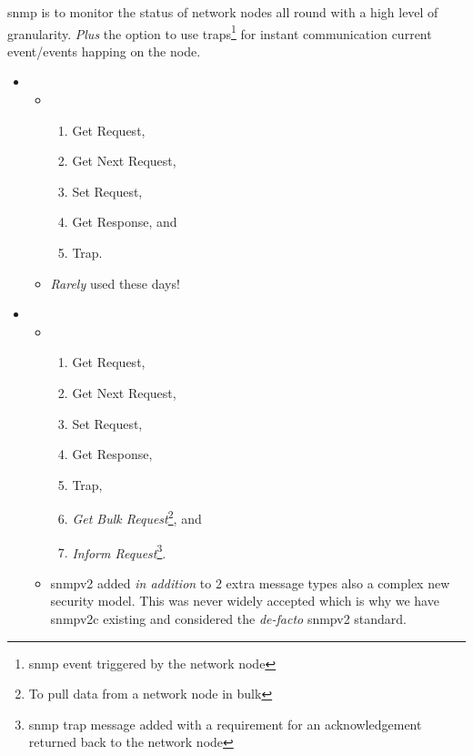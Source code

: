\gls{snmp} is  to monitor the status of network nodes all round with a high level of granularity. \textit{Plus} the option to use traps\footnote{\gls{snmp} event triggered by the network node} for instant communication  current event/events happing on the node.\cite{wiki:Simple_Network_Management_Protocol}


\begin{itemize}
	\item {}
	\begin{itemize}
		\item {}
		\begin{enumerate}
			\item Get Request,
			\item Get Next Request,
			\item Set Request,
			\item Get Response, and
			\item Trap.
		\end{enumerate}
		\item \textit{Rarely} used these days!
	\end{itemize}
	\newpage %
	\item {}
	\begin{itemize}
		\item {}
		\begin{enumerate}
			\item Get Request,
			\item Get Next Request,
			\item Set Request,
			\item Get Response,
			\item Trap,
			\item \textit{Get Bulk Request}\footnote{To pull data from a network node in bulk}, and
			\item \textit{Inform Request}\footnote{\gls{snmp} trap message added with a requirement for an acknowledgement returned back to the network node}.
		\end{enumerate}
		\item \gls{snmp}v2 added \textit{in addition} to 2 extra message types also a complex new security model. This was never widely accepted which is why we have \gls{snmp}v2c existing and considered the \textit{de-facto} \gls{snmp}v2 standard.
	\end{itemize}

\end{itemize}
